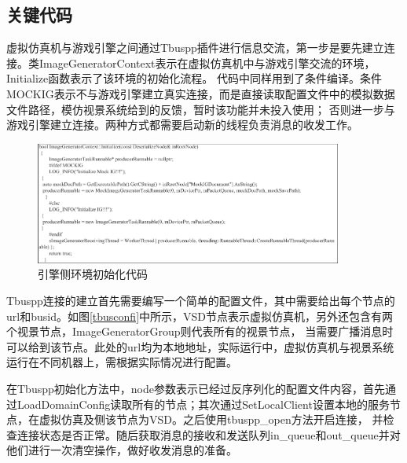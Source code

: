 \subsection{关键代码}
虚拟仿真机与游戏引擎之间通过Tbuspp插件进行信息交流，第一步是要先建立连接。类ImageGeneratorContext表示在虚拟仿真机中与游戏引擎交流的环境，Initialize函数表示了该环境的初始化流程。
代码中同样用到了条件编译。条件MOCKIG表示不与游戏引擎建立真实连接，而是直接读取配置文件中的模拟数据文件路径，模仿视景系统给到的反馈，暂时该功能并未投入使用；
否则进一步与游戏引擎建立连接。两种方式都需要启动新的线程负责消息的收发工作。
\begin{figure}[h!]
    \begin{center}
        \includegraphics[width=0.9\textwidth]{pictures/code17.pdf}
        \caption{引擎侧环境初始化代码}
    \end{center}
\end{figure}
\par
Tbuspp连接的建立首先需要编写一个简单的配置文件，其中需要给出每个节点的url和busid。如图\ref{tbusconfi}中所示，VSD节点表示虚拟仿真机，另外还包含有两个视景节点，ImageGeneratorGroup则代表所有的视景节点，
当需要广播消息时可以给到该节点。此处的url均为本地地址，实际运行中，虚拟仿真机与视景系统运行在不同机器上，需根据实际情况进行配置。
\par
在Tbuspp初始化方法中，node参数表示已经过反序列化的配置文件内容，首先通过LoadDomainConfig读取所有的节点；其次通过SetLocalClient设置本地的服务节点，在虚拟仿真及侧该节点为VSD。之后使用tbuspp\_open方法开启连接，
并检查连接状态是否正常。随后获取消息的接收和发送队列in\_queue和out\_queue并对他们进行一次清空操作，做好收发消息的准备。

